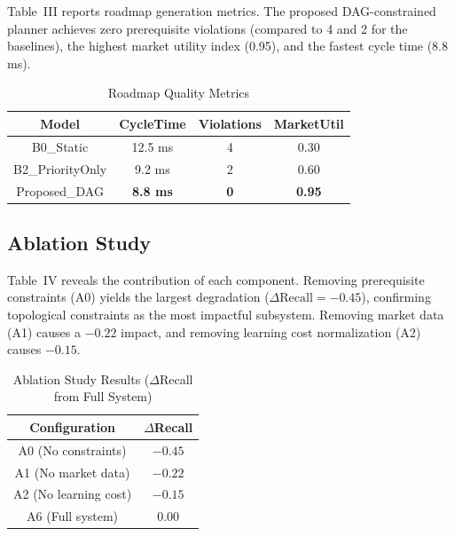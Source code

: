 \documentclass[conference]{IEEEtran}
\begin{document}
Table~III reports roadmap generation metrics. The proposed DAG-constrained planner achieves zero prerequisite violations (compared to 4 and 2 for the baselines), the highest market utility index (0.95), and the fastest cycle time (8.8 ms).

\begin{table}[htbp]
    \caption{Roadmap Quality Metrics}
    \begin{center}
        \begin{tabular}{|c|c|c|c|}
            \hline
            \textbf{Model} & \textbf{CycleTime} & \textbf{Violations} & \textbf{MarketUtil} \\
            \hline
            B0\_Static       & 12.5 ms & 4 & 0.30 \\
            \hline
            B2\_PriorityOnly & 9.2 ms  & 2 & 0.60 \\
            \hline
            Proposed\_DAG    & \textbf{8.8 ms} & \textbf{0} & \textbf{0.95} \\
            \hline
        \end{tabular}
        \label{tab:roadmap}
    \end{center}
\end{table}

\subsection{Ablation Study}

Table~IV reveals the contribution of each component. Removing prerequisite constraints (A0) yields the largest degradation ($\Delta\text{Recall}{=}{-}0.45$), confirming topological constraints as the most impactful subsystem. Removing market data (A1) causes a $-0.22$ impact, and removing learning cost normalization (A2) causes $-0.15$.

\begin{table}[htbp]
    \caption{Ablation Study Results ($\Delta$Recall from Full System)}
    \begin{center}
        \begin{tabular}{|c|c|}
            \hline
            \textbf{Configuration} & \textbf{$\Delta$Recall} \\
            \hline
            A0 (No constraints)     & $-0.45$ \\
            \hline
            A1 (No market data)     & $-0.22$ \\
            \hline
            A2 (No learning cost)   & $-0.15$ \\
            \hline
            A6 (Full system)        & $0.00$ \\
            \hline
        \end{tabular}
        \label{tab:ablation}
    \end{center}
\end{table}
\end{document}
